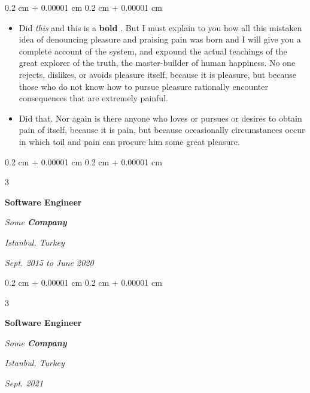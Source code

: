 \documentclass[10pt, letterpaper]{article}
\newenvironment{highlights}{
    \begin{itemize}[
        topsep=0.10 cm,
        parsep=0.10 cm,
        partopsep=0pt,
        itemsep=0pt,
        leftmargin=0.4 cm + 10pt + 0.6 cm
    ]
}{
    \end{itemize}
} %
\newenvironment{onecolentry}{
    \begin{adjustwidth}{
        0.2 cm + 0.00001 cm
    }{
        0.2 cm + 0.00001 cm
    }
}{
    \end{adjustwidth}
} %
\newenvironment{threecolentry}[3][]{
    \onecolentry
    \def\thirdColumn{#3}
    \setcolumnwidth{0.6 cm, \fill, 4.5 cm}
    \begin{paracol}{3}
    #2 \switchcolumn
}{
    \switchcolumn \raggedleft \thirdColumn
    \end{paracol}
    \endonecolentry
} %
\let\hrefWithoutArrow\href
\renewcommand{\href}[2]{\hrefWithoutArrow{#1}{\mbox{\ifthenelse{\equal{#2}{}}{ }{#2 }\raisebox{.15ex}{\footnotesize \faExternalLink*}}}}
\begin{document}
        \vspace{0.10 cm-3px}
        \begin{onecolentry}
            \begin{highlights}
                \item Did \textit{this} and this is a \textbf{bold} \href{https://example.com}{link}. But I must explain to you how all this mistaken idea of denouncing pleasure and praising pain was born and I will give you a complete account of the system, and expound the actual teachings of the great explorer of the truth, the master-builder of human happiness. No one rejects, dislikes, or avoids pleasure itself, because it is pleasure, but because those who do not know how to pursue pleasure rationally encounter consequences that are extremely painful.
                \item Did that. Nor again is there anyone who loves or pursues or desires to obtain pain of itself, because it is pain, but because occasionally circumstances occur in which toil and pain can procure him some great pleasure.
            \end{highlights}
        \end{onecolentry}


        \vspace{0.2 cm-3px}

        \begin{threecolentry}{
            \vspace*{\fill}
            \textbullet
            \vspace*{3px}
            \vspace*{\fill}
        }{
        \textit{Istanbul, Turkey}    
            
        \textit{Sept. 2015 to June 2020}}
            \textbf{Software Engineer}
            
            \textit{Some \textbf{Company}}
        \end{threecolentry}



        \vspace{0.2 cm-3px}

        \begin{threecolentry}{
            \vspace*{\fill}
            \textbullet
            \vspace*{3px}
            \vspace*{\fill}
        }{
        \textit{Istanbul, Turkey}    
            
        \textit{Sept. 2021}}
            \textbf{Software Engineer}
            
            \textit{Some \textbf{Company}}
        \end{threecolentry}
\end{document}
